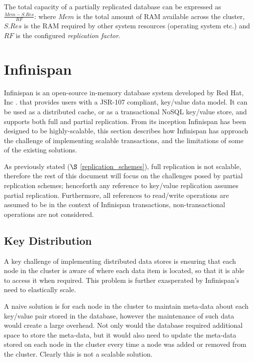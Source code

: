 	The total capacity of a partially replicated database can be expressed as $\frac{Mem - S.Res}{RF}$: where $Mem$ is the total amount of RAM available across the cluster, $S.Res$ is the RAM required by other system resources (operating system etc.) and $RF$ is the configured \emph{replication factor}.  


\section{Infinispan}\label{sec:infinispan}
Infinispan \citep{Infinispan} is an open-source in-memory database system developed by Red Hat, Inc \citep{RedHat}. that provides users with a JSR-107 \citep{JSR-107} compliant, key/value data model.  It can be used as a distributed cache, or as a transactional NoSQL key/value store, and supports both full and partial replication.  From its inception Infinispan has been designed  to be highly-scalable, this section describes how Infinispan has approach the challenge of implementing scalable transactions, and the limitations of some of the existing solutions.  

As previously stated ($\S$ \ref{replication_schemes}), full replication is not scalable, therefore the rest of this document will focus on the challenges posed by partial replication schemes; henceforth any reference to key/value replication assumes partial replication.  Furthermore, all references to read/write operations are assumed to be in the context of Infinispan transactions, non-transactional operations are not considered.  

    \subsection{Key Distribution}
    A key challenge of implementing distributed data stores is ensuring that each node in the cluster is aware of where each data item is located, so that it is able to access it when required.  This problem is further exasperated by Infinispan's need to elastically scale.  
    
    A naive solution is for each node in the cluster to maintain meta-data about each key/value pair stored in the database, however the maintenance of such data would create a large overhead.  Not only would the database required additional space to store the meta-data, but it would also need to update the meta-data stored on each node in the cluster every time a node was added or removed from the cluster.  Clearly this is not a scalable solution.  
    
